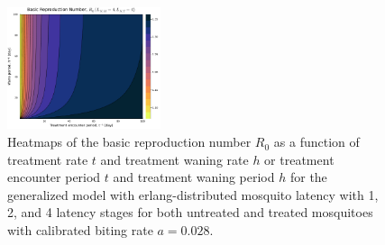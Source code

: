 \documentclass[11pt]{article}
\begin{document}
\begin{figure}[H]
  \includegraphics[width=0.4\textwidth]{../../fig/R0_periods_txh_4x4_cal.pdf}
  \caption{Heatmaps of the basic reproduction number $R_0$ as a function of treatment rate $t$ and treatment waning rate $h$ or treatment encounter period $t$ and treatment waning period $h$ for the generalized model with erlang-distributed mosquito latency with 1, 2, and 4 latency stages for both untreated and treated mosquitoes with calibrated biting rate $a=0.028$.}
\end{figure}
\end{document}
